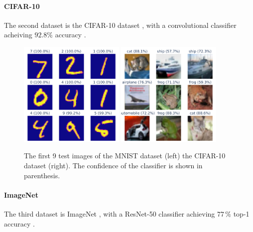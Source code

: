 \documentclass[]{scrarticle}
\begin{document}
\paragraph{CIFAR-10}
The second dataset is the CIFAR-10 dataset \cite{Krizhevsky2009LearningML},
with a convolutional classifier acheiving $92.8 \%$ accuracy \cite{999912022cifar10fastsimple}.

\begin{figure}[h]
  \centering
  \includegraphics[width=0.45\textwidth]{images/sample_MNIST.png}
  \includegraphics[width=0.45\textwidth]{images/sample_CIFAR10.png}
  \caption{
    The first 9 test images of
    the MNIST dataset (left)
    the CIFAR-10 dataset (right).
    The confidence of the classifier is shown in parenthesis.}
  \label{fig:mnist_cifar10_samples}
\end{figure}


\paragraph{ImageNet}
The third dataset is ImageNet \cite{Deng2009ImageNetAL}, with a ResNet-50 classifier
achieving $77\,\%$ top-1 accuracy \cite{He2015DeepRL}.
\end{document}
